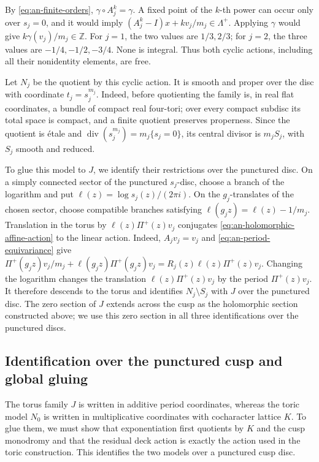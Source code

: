 \documentclass[11pt]{article}
\theoremstyle{definition}
\theoremstyle{remark}
\numberwithin{equation}{section}
\newcommand{\ZZ}{\mathbb Z}
\begin{document}
By \eqref{eq:an-finite-orders}, $\gamma\circ A_j^k=\gamma$.  A fixed point
of the $k$-th power can occur
only over $s_j=0$, and it would imply
$(A_j^k-I)x+kv_j/m_j\in\Lambda^+$.
Applying $\gamma$ would give
$k\gamma(v_j)/m_j\in\ZZ$.  For $j=1$, the two values are
$1/3,2/3$; for $j=2$, the three values are
$-1/4,-1/2,-3/4$.  None is integral.  Thus both cyclic actions, including
all their nonidentity elements, are free.

Let $N_j$ be the quotient by this cyclic action.  It is smooth and proper
over the disc with coordinate $t_j=s_j^{m_j}$.
Indeed, before quotienting the family is, in real flat coordinates, a
bundle of compact real four-tori; over every compact subdisc its total
space is compact, and a finite quotient preserves properness.  Since the
quotient is \'etale and
$\operatorname{div}(s_j^{m_j})=m_j\{s_j=0\}$, its central divisor is
$m_jS_j$, with $S_j$ smooth and reduced.

To glue this model to $J$, we identify their restrictions over the
punctured disc.  On a simply connected sector of the punctured $s_j$-disc,
choose a branch of the logarithm and put
$\ell(z)=\log s_j(z)/(2\pi i)$.
On the $g_j$-translates of the chosen sector, choose compatible branches
satisfying $\ell(g_jz)=\ell(z)-1/m_j$.  Translation in the torus by
$\ell(z)\Pi^+(z)v_j$
conjugates \eqref{eq:an-holomorphic-affine-action} to the linear action.
Indeed, $A_jv_j=v_j$ and
\eqref{eq:an-period-equivariance} give
$\Pi^+(g_jz)v_j/m_j+\ell(g_jz)\Pi^+(g_jz)v_j
=R_j(z)\ell(z)\Pi^+(z)v_j$.
Changing the logarithm changes the translation
$\ell(z)\Pi^+(z)v_j$ by the period $\Pi^+(z)v_j$.  It therefore descends to
the torus and identifies $N_j\setminus S_j$ with $J$ over the punctured
disc.  The zero section of $J$ extends across the cusp as the holomorphic
section constructed above; we use this zero section in all three
identifications over the punctured discs.

\subsection{Identification over the punctured cusp and global gluing}

The torus family $J$ is written in additive period coordinates, whereas
the toric model $N_0$ is written in multiplicative coordinates with
cocharacter lattice $K$.  To glue them, we must show that exponentiation
first quotients by $K$ and the cusp monodromy and that the residual deck
action is exactly the action used in the toric construction.  This identifies
the two models over a punctured cusp disc.
\end{document}
